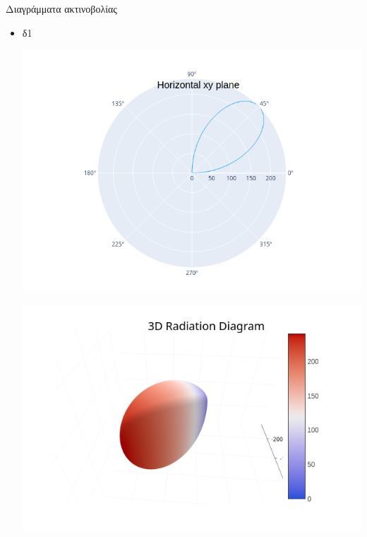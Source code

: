 \documentclass[12pt]{article}
\begin{document}
\newpage
Διαγράμματα ακτινοβολίας
\begin{itemize}
    \item δ1
    \begin{center}
        \includegraphics*[scale=0.6]{d1_xy.png}
    \end{center}
    \begin{center}
        \includegraphics*[scale=0.6]{d1_3d.png}
    \end{center}


\end{itemize}
\end{document}

